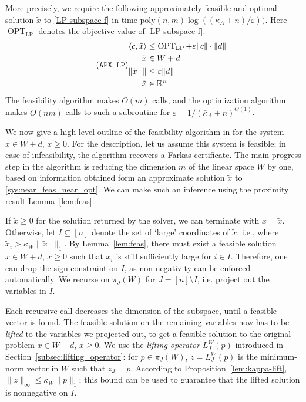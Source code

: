 \documentclass[11pt, a4paper]{article}
\newcommand{\pr}[2]{\left\langle #1, #2 \right\rangle}
\newcommand{\1}{\mathbbm{1}}
\theoremstyle{case}
\newcommand{\R}{\mathbb{R}}
\begin{document}
More precisely, we require  the following approximately feasible and optimal solution $\tilde x$ to \ref{LP-subspace-f} in time $\mathrm{poly}(n,m)\log((\bar\kappa_A + n)/\varepsilon)\big)$.
Here $\operatorname{OPT}_{\mathrm{LP}}$ denotes the objective value of \ref{LP-subspace-f}.
\begin{equation}
  \label{sys:near_feas_near_opt}
  \tag{\texttt{APX-LP}}
  \begin{aligned}
  \pr{c}{\tilde x} &\le \operatorname{OPT}_{\mathrm{LP}}+ \varepsilon \|c\|\cdot\|d\| \\ 
  \tilde x &\in W + d \\
  \|\tilde x^-\| &\le \varepsilon \|d\|\,\\
  \tilde x &\in \R^n 
  \end{aligned}
\end{equation}
The feasibility algorithm makes $O(m)$ calls, and the optimization algorithm makes $O(nm)$ calls to such a subroutine for $\varepsilon=1/(\bar\kappa_A + n)^{O(1)}$.

We now give a high-level outline of the feasibility algorithm in \cite{DadushNV20} for the system $x\in W+d$, $x\ge 0$. For the description, let us assume this system is feasible; in case of infeasibility, the algorithm recovers a Farkas-certificate.
The main progress step in the algorithm is reducing the dimension $m$ of the linear space $W$ by one,
based on information obtained form  an approximate solution  $\tilde x$  to \eqref{sys:near_feas_near_opt}. We can make such an inference using the proximity result Lemma~\ref{lem:feas}. 

If $\tilde x\ge 0$ for the solution returned by the solver, we can terminate with $x=\tilde x$. 
Otherwise, let $I \subseteq [n]$ denote the set of `large' coordinates of $\tilde x$, i.e., where $\tilde x_i>\kappa_W\|\tilde x^-\|_1$. By Lemma~\ref{lem:feas}, there must exist a feasible solution $x\in W+d$, $x\ge 0$ such that $x_i$ is still sufficiently large for $i\in I$.
Therefore,
 one can drop the sign-constraint on $I$, as non-negativity can be enforced automatically. We recurse on $\pi_J(W)$ for $J=[n]\setminus I$, i.e. project out the variables in $I$.

Each recursive call decreases the dimension of the subspace, until a feasible vector is found. The feasible solution on the remaining variables now has to be \emph{lifted} to the variables we projected out, to get a feasible solution to the original problem $x\in W + d$, $x\ge 0$. We use the \emph{lifting operator} $L_J^W(p)$ introduced in Section~\ref{subsec:lifting_operator}: for $p\in \pi_J(W)$, $z=L_J^W(p)$ is the minimum-norm vector in $W$ such that $z_J=p$.
According to Proposition~\ref{lem:kappa-lift}, $\|z\|_\infty\le \kappa_W\|p\|_1$; this bound can be used to guarantee that the lifted solution is nonnegative on $I$.
\end{document}
